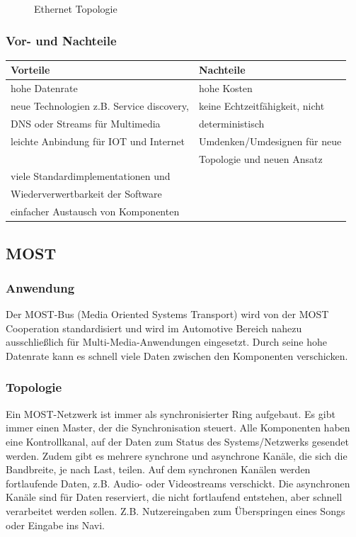 \begin{figure}[h!]
\begin{subfigure}[b]{0.4\textwidth}
        \end{subfigure}
        \caption{Ethernet Topologie}
    \end{figure}
    
    \subsubsection{Vor- und Nachteile}
    \begin{tabular}{l|l}
        \textbf{Vorteile} & \textbf{Nachteile}\\
        \hline hohe Datenrate & hohe Kosten\\
        \hline neue Technologien z.B. Service discovery,  & keine Echtzeitfähigkeit, nicht\\
        DNS oder Streams für Multimedia & deterministisch\\
        \hline leichte Anbindung für IOT und Internet & Umdenken/Umdesignen für neue \\
        & Topologie und neuen Ansatz\\
        \hline viele Standardimplementationen und&\\
        Wiederverwertbarkeit der Software&\\
        \hline einfacher Austausch von Komponenten &\\
    \end{tabular}
    
    \subsection{MOST}		
    \subsubsection{Anwendung}
    Der MOST-Bus (Media Oriented Systems Transport) wird von der MOST Cooperation standardisiert und wird im Automotive Bereich nahezu ausschließlich für Multi-Media-Anwendungen eingesetzt. Durch seine hohe Datenrate kann es schnell viele Daten zwischen den Komponenten verschicken.
    
    
    \cite{.MH_Vehicle}
    
    \subsubsection{Topologie}
    Ein MOST-Netzwerk ist immer als synchronisierter Ring aufgebaut. Es gibt immer einen Master, der die Synchronisation steuert. Alle Komponenten haben eine Kontrollkanal, auf der Daten zum Status des Systems/Netzwerks gesendet werden. Zudem gibt es mehrere synchrone und asynchrone Kanäle, die sich die Bandbreite, je nach Last, teilen.
    Auf dem synchronen Kanälen werden fortlaufende Daten, z.B. Audio- oder Videostreams verschickt.
    Die asynchronen Kanäle sind für Daten reserviert, die nicht fortlaufend entstehen, aber schnell verarbeitet werden sollen. Z.B. Nutzereingaben zum Überspringen eines Songs oder Eingabe ins Navi. \cite{BP01}
    
